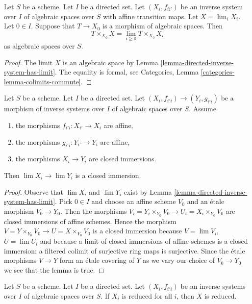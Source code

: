 \begin{lemma}
\label{lemma-space-over-limit}
Let $S$ be a scheme. Let $I$ be a directed set.
Let $(X_i, f_{ii'})$ be an inverse system over $I$ of algebraic spaces
over $S$ with affine transition maps.
Let $X = \lim_i X_i$. Let $0 \in I$. Suppose that $T \to X_0$ is a
morphism of algebraic spaces. Then
$$
T \times_{X_0} X = \lim_{i \geq 0} T \times_{X_0} X_i
$$
as algebraic spaces over $S$.
\end{lemma}

\begin{proof}
The limit $X$ is an algebraic space by
Lemma \ref{lemma-directed-inverse-system-has-limit}.
The equality is formal, see
Categories, Lemma \ref{categories-lemma-colimits-commute}.
\end{proof}

\begin{lemma}
\label{lemma-directed-inverse-system-closed-immersions}
Let $S$ be a scheme. Let $I$ be a directed set.
Let $(X_i, f_{i'i}) \to (Y_i, g_{i'i})$ be a morphism
of inverse systems over $I$ of algebraic spaces over $S$.
Assume
\begin{enumerate}
\item the morphisms $f_{i'i} : X_{i'} \to X_i$ are affine,
\item the morphisms $g_{i'i} : Y_{i'} \to Y_i$ are affine,
\item the morphisms $X_i \to Y_i$ are closed immersions.
\end{enumerate}
Then $\lim X_i \to \lim Y_i$ is a closed immersion.
\end{lemma}

\begin{proof}
Observe that $\lim X_i$ and $\lim Y_i$ exist by
Lemma \ref{lemma-directed-inverse-system-has-limit}.
Pick $0 \in I$ and choose an affine scheme $V_0$ and an \'etale morphism
$V_0 \to Y_0$. Then the morphisms
$V_i = Y_i \times_{Y_0} V_0 \to U_i = X_i \times_{Y_0} V_0$
are closed immersions of affine schemes.
Hence the morphism $V = Y \times_{Y_0} V_0 \to U = X \times_{Y_0} V_0$
is a closed immersion because $V = \lim V_i$, $U = \lim U_i$
and because a limit of closed immersions of affine schemes is a
closed immersion: a filtered colimit of surjective ring maps
is surjective. Since the \'etale morphisms $V \to Y$ form an
\'etale covering of $Y$ as we vary our choice of $V_0 \to Y_0$
we see that the lemma is true.
\end{proof}

\begin{lemma}
\label{lemma-directed-inverse-system-reduced}
Let $S$ be a scheme. Let $I$ be a directed set.
Let $(X_i, f_{i'i})$ be an inverse systems over $I$
of algebraic spaces over $S$. If $X_i$ is reduced
for all $i$, then $X$ is reduced.
\end{lemma}

